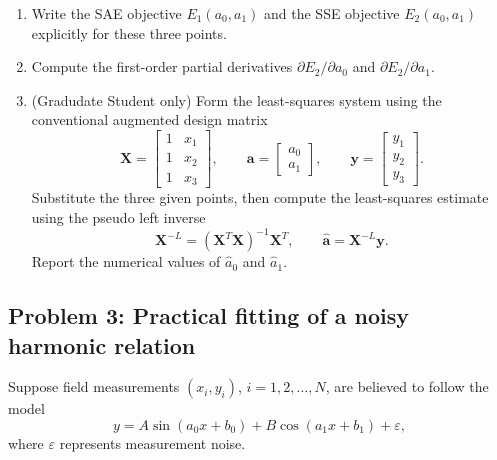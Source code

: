 \documentclass[12pt]{article}
\begin{document}
\begin{enumerate}
    \renewcommand{\labelenumi}{(\alph{enumi})}
    \item Write the SAE objective \(E_1(a_0,a_1)\) and the SSE objective \(E_2(a_0,a_1)\) explicitly for these three points.

   \vspace{18pt}
    \fullunderline
    
    \vspace{18pt} 
    \fullunderline

    \item Compute the first-order partial derivatives \(\partial E_2/\partial a_0\) and \(\partial E_2/\partial a_1\).

   \vspace{18pt}
    \fullunderline
    
    \vspace{18pt} 
    \fullunderline

    \item (Gradudate Student only) Form the least-squares system using the conventional augmented design matrix
    \[
    \bm{X}=
    \begin{bmatrix}
    1 & x_1\\
    1 & x_2\\
    1 & x_3
    \end{bmatrix},
    \qquad
    \bm{a}=
    \begin{bmatrix}
    a_0\\
    a_1
    \end{bmatrix},
    \qquad
    \bm{y}=
    \begin{bmatrix}
    y_1\\
    y_2\\
    y_3
    \end{bmatrix}.
    \]
    Substitute the three given points, then compute the least-squares estimate using the pseudo left inverse
    \[
    \bm{X}^{-L}=(\bm{X}^T\bm{X})^{-1}\bm{X}^T,
    \qquad
    \hat{\bm{a}}=\bm{X}^{-L}\bm{y}.
    \]
    Report the numerical values of \(\hat{a}_0\) and \(\hat{a}_1\).

   \vspace{18pt}
    \fullunderline
    
    \vspace{18pt} 
    \fullunderline
\end{enumerate}

\newpage

\subsection*{Problem 3: Practical fitting of a noisy harmonic relation}
Suppose field measurements \((x_i,y_i)\), \(i=1,2,\ldots,N\), are believed to follow the model
\[
y = A\sin(a_0x+b_0) + B\cos(a_1x+b_1) + \varepsilon,
\]
where \(\varepsilon\) represents measurement noise.
\end{document}
